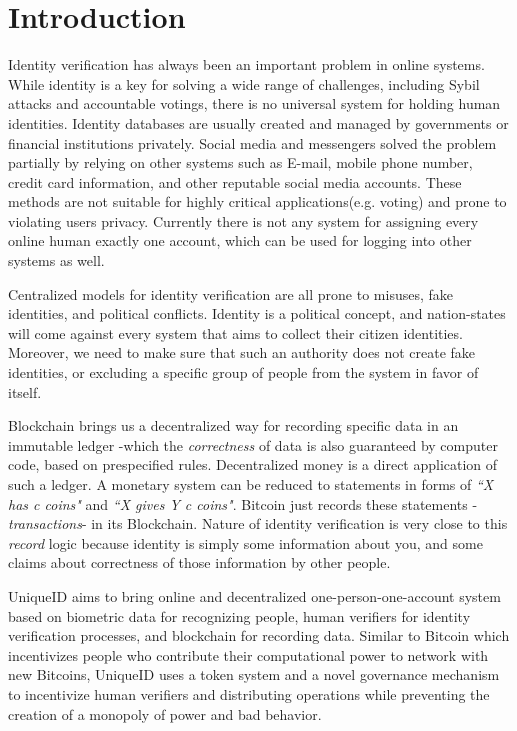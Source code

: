 \documentclass[conference]{IEEEtran}
\begin{document}
\section{Introduction}
Identity verification has always been an important problem in online systems. While identity is a key for solving a wide range of challenges, including Sybil attacks \cite{Sybil} and accountable votings, there is no universal system for holding human identities. Identity databases are usually created and managed by governments or financial institutions privately. Social media and messengers solved the problem partially by relying on other systems such as E-mail, mobile phone number, credit card information, and other reputable social media accounts. These methods are not suitable for highly critical applications(e.g. voting) and prone to violating users privacy. Currently there is not any system for assigning every online human exactly one account, which can be used for logging into other systems as well.


Centralized models for identity verification are all prone to misuses, fake identities, and political conflicts. Identity is a political concept, and nation-states will come against every system that aims to collect their citizen identities. Moreover, we need to make sure that such an authority does not create fake identities, or excluding a specific group of people from the system in favor of itself.


Blockchain brings us a decentralized way for recording specific data in an immutable ledger -which the \textit{correctness} of data is also guaranteed by computer code, based on prespecified rules. Decentralized money is a direct application of such a ledger. A monetary system can be reduced to statements in forms of \textit{``X has c coins"} and \textit{``X gives Y c coins"}. Bitcoin \cite{bitcoin} just records these statements -\textit{transactions}- in its Blockchain. Nature of identity verification is very close to this \textit{record} logic because identity is simply some information about you, and some claims about correctness of those information by other people. 


UniqueID aims to bring online and decentralized one-person-one-account system based on biometric data for recognizing people, human verifiers for identity verification processes, and blockchain for recording data. Similar to Bitcoin which incentivizes people who contribute their computational power to network with new Bitcoins, UniqueID uses a token system and a novel governance mechanism to incentivize human verifiers and distributing operations while preventing the creation of a monopoly of power and bad behavior.
\end{document}
